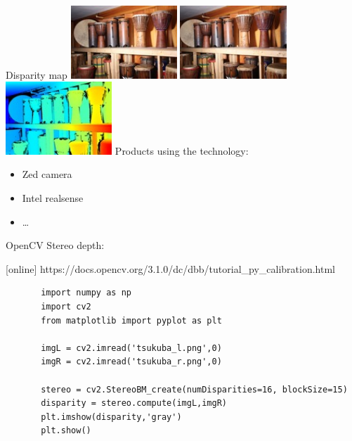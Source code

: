 \documentclass[aspectratio=169]{beamer}
\begin{document}
\begin{frame}{Disparity map}
    \centering
    \includegraphics[width=0.3\textwidth]{images/im0.jpg}
    \includegraphics[width=0.3\textwidth]{images/im1.jpg}
    \includegraphics[width=0.3\textwidth]{images/disp0.jpg}
    Products using the technology:
    \begin{itemize}
        \item Zed camera
        \item Intel realsense
        \item \dots
    \end{itemize}
\end{frame}


\begin{frame}[fragile]{OpenCV}
    Stereo depth:
    \begin{thebibliography}{9}
        [online]
        \small https://docs.opencv.org/3.1.0/dc/dbb/tutorial\_py\_calibration.html
    \end{thebibliography}
    \begin{verbatim}
       import numpy as np
       import cv2
       from matplotlib import pyplot as plt
       
       imgL = cv2.imread('tsukuba_l.png',0)
       imgR = cv2.imread('tsukuba_r.png',0)
       
       stereo = cv2.StereoBM_create(numDisparities=16, blockSize=15)
       disparity = stereo.compute(imgL,imgR)
       plt.imshow(disparity,'gray')
       plt.show()
    \end{verbatim}
\end{frame}
\end{document}
